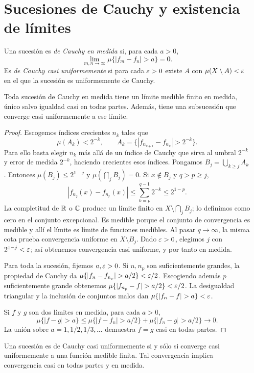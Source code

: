 \section{Sucesiones de Cauchy y existencia de límites}\label{lectura:v2-15}
\begin{definicion}
Una sucesión es \emph{de Cauchy en medida} si, para cada $a>0$,
\[\lim_{m,n\to\infty}\mu\{|f_m-f_n|>a\}=0.
\]
Es \emph{de Cauchy casi uniformemente} si para cada $\varepsilon>0$ existe $A$ con $\mu(X\setminus A)<\varepsilon$ en el que la sucesión es uniformemente de Cauchy.
\end{definicion}
\begin{teorema}\label{teo:v2-completitud-medida}
Toda sucesión de Cauchy en medida tiene un límite medible finito en medida, único salvo igualdad casi en todas partes. Además, tiene una subsucesión que converge casi uniformemente a ese límite.
\end{teorema}
\begin{proof}
Escogemos índices crecientes $n_k$ tales que
\[\mu(A_k)<2^{-k},\qquad A_k=\{|f_{n_{k+1}}-f_{n_k}|>2^{-k}\}.
\]
Para ello basta elegir $n_k$ más allá de un índice de Cauchy que sirva al umbral $2^{-k}$ y error de medida $2^{-k}$, haciendo crecientes esos índices. Pongamos $B_j=\bigcup_{k\ge j}A_k$. Entonces $\mu(B_j)\le2^{1-j}$ y $\mu(\bigcap_jB_j)=0$. Si $x\notin B_j$ y $q>p\ge j$,
\[|f_{n_q}(x)-f_{n_p}(x)|\le\sum_{k=p}^{q-1}2^{-k}\le2^{1-p}.
\]
La completitud de $\mathbb R$ o $\mathbb C$ produce un límite finito en $X\setminus\bigcap_jB_j$; lo definimos como cero en el conjunto excepcional. Es medible porque el conjunto de convergencia es medible y allí el límite es límite de funciones medibles. Al pasar $q\to\infty$, la misma cota prueba convergencia uniforme en $X\setminus B_j$. Dado $\varepsilon>0$, elegimos $j$ con $2^{1-j}<\varepsilon$; así obtenemos convergencia casi uniforme, y por tanto en medida.

Para toda la sucesión, fijemos $a,\varepsilon>0$. Si $n,n_p$ son suficientemente grandes, la propiedad de Cauchy da $\mu\{|f_n-f_{n_p}|>a/2\}<\eps/2$. Escogiendo además $p$ suficientemente grande obtenemos $\mu\{|f_{n_p}-f|>a/2\}<\eps/2$. La desigualdad triangular y la inclusión de conjuntos malos dan $\mu\{|f_n-f|>a\}<\eps$.

Si $f$ y $g$ son dos límites en medida, para cada $a>0$,
\[\mu\{|f-g|>a\}\le\mu\{|f-f_n|>a/2\}+\mu\{|f_n-g|>a/2\}\longrightarrow0.
\]
La unión sobre $a=1,1/2,1/3,\ldots$ demuestra $f=g$ casi en todas partes.
\end{proof}
\begin{proposicion}
Una sucesión es de Cauchy casi uniformemente si y sólo si converge casi uniformemente a una función medible finita. Tal convergencia implica convergencia casi en todas partes y en medida.
\end{proposicion}
